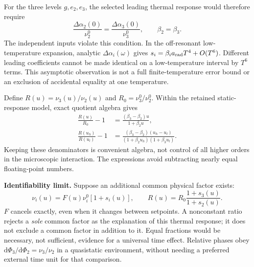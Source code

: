 \documentclass[11pt,a4paper]{article}
\newcommand{\dd}{\mathrm d}
\begin{document}
For the three levels $g,e_2,e_3$, the selected leading thermal response
would therefore require
\begin{equation}\label{eq:necessary}
 \frac{\Delta\alpha_2(0)}{\nu_2^0}
 =\frac{\Delta\alpha_3(0)}{\nu_3^0},\qquad \beta_2=\beta_3 .
\end{equation}
The independent inputs violate this condition. In the off-resonant
low-temperature expansion, analytic $\Delta\alpha_i(\omega)$ gives
$s_i=\beta_i a_{\rm rad}T^4+O(T^6)$. Different leading coefficients
cannot be made identical on a low-temperature interval by $T^6$
terms. This asymptotic observation is not a full finite-temperature
error bound or an exclusion of accidental equality at one temperature.

Define $R(u)=\nu_3(u)/\nu_2(u)$ and $R_0=\nu_3^0/\nu_2^0$.
Within the retained static-response model, exact quotient algebra gives
\begin{align}
 \frac{R(u)}{R_0}-1
 &=\frac{(\beta_3-\beta_2)u}{1+\beta_2u},\label{eq:ratio}\\
 \frac{R(u_h)}{R(u_l)}-1
 &=\frac{(\beta_3-\beta_2)(u_h-u_l)}
 {(1+\beta_2u_h)(1+\beta_3u_l)}.\label{eq:modulation}
\end{align}
Keeping these denominators is convenient algebra, not control of all
higher orders in the microscopic interaction. The expressions avoid
subtracting nearly equal floating-point numbers.

\textbf{Identifiability limit.} Suppose an additional common physical
factor exists:
\begin{equation}\label{eq:blind}
 \nu_i(u)=F(u)\nu_i^0[1+s_i(u)],\qquad
 R(u)=R_0\frac{1+s_3(u)}{1+s_2(u)} .
\end{equation}
$F$ cancels exactly, even when it changes between setpoints. A
nonconstant ratio rejects a \emph{sole} common factor as the explanation
of this thermal response; it does not exclude a common factor in
addition to it. Equal fractions would be necessary, not sufficient,
evidence for a universal time effect. Relative phases obey
$\dd\Phi_3/\dd\Phi_2=\nu_3/\nu_2$ in a quasistatic environment,
without needing a preferred external time unit for that comparison.

\newpage
\end{document}
